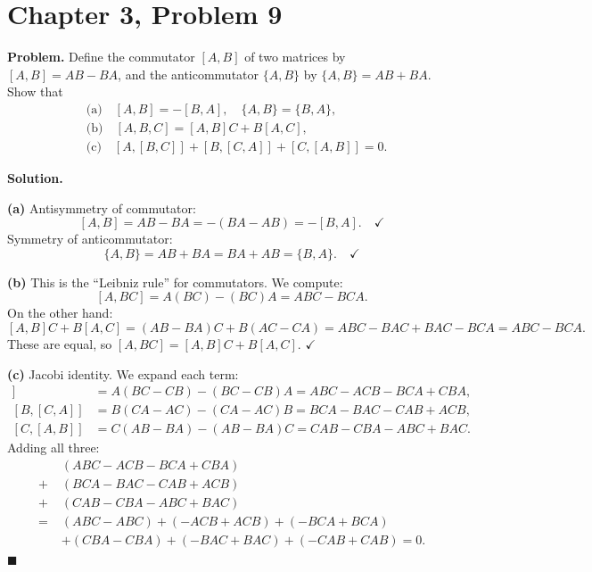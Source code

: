\documentclass[12pt]{article}
\begin{document}
\section*{Chapter 3, Problem 9}

\textbf{Problem.} Define the commutator $[A, B]$ of two matrices by $[A, B] = AB - BA$, and the anticommutator $\{A, B\}$ by $\{A, B\} = AB + BA$. Show that
\begin{align*}
&\text{(a)}\quad [A, B] = -[B, A], \quad \{A, B\} = \{B, A\}, \\
&\text{(b)}\quad [A, B, C] = [A, B]C + B[A, C], \\
&\text{(c)}\quad [A, [B, C]] + [B, [C, A]] + [C, [A, B]] = 0.
\end{align*}

\bigskip
\textbf{Solution.}

\textbf{(a)} Antisymmetry of commutator:
\[
[A, B] = AB - BA = -(BA - AB) = -[B, A]. \quad \checkmark
\]
Symmetry of anticommutator:
\[
\{A, B\} = AB + BA = BA + AB = \{B, A\}. \quad \checkmark
\]

\medskip
\textbf{(b)} This is the ``Leibniz rule'' for commutators. We compute:
\[
[A, BC] = A(BC) - (BC)A = ABC - BCA.
\]
On the other hand:
\[
[A, B]C + B[A, C] = (AB - BA)C + B(AC - CA) = ABC - BAC + BAC - BCA = ABC - BCA.
\]
These are equal, so $[A, BC] = [A, B]C + B[A, C]$. \hfill $\checkmark$

\medskip
\textbf{(c)} Jacobi identity. We expand each term:
\begin{align*}
[A, [B, C]] &= A(BC - CB) - (BC - CB)A = ABC - ACB - BCA + CBA, \\
[B, [C, A]] &= B(CA - AC) - (CA - AC)B = BCA - BAC - CAB + ACB, \\
[C, [A, B]] &= C(AB - BA) - (AB - BA)C = CAB - CBA - ABC + BAC.
\end{align*}
Adding all three:
\begin{align*}
&(ABC - ACB - BCA + CBA) \\
+\; &(BCA - BAC - CAB + ACB) \\
+\; &(CAB - CBA - ABC + BAC) \\
= \; &(ABC - ABC) + (-ACB + ACB) + (-BCA + BCA) \\
&+ (CBA - CBA) + (-BAC + BAC) + (-CAB + CAB) = 0.
\end{align*}
\hfill $\blacksquare$
\end{document}
